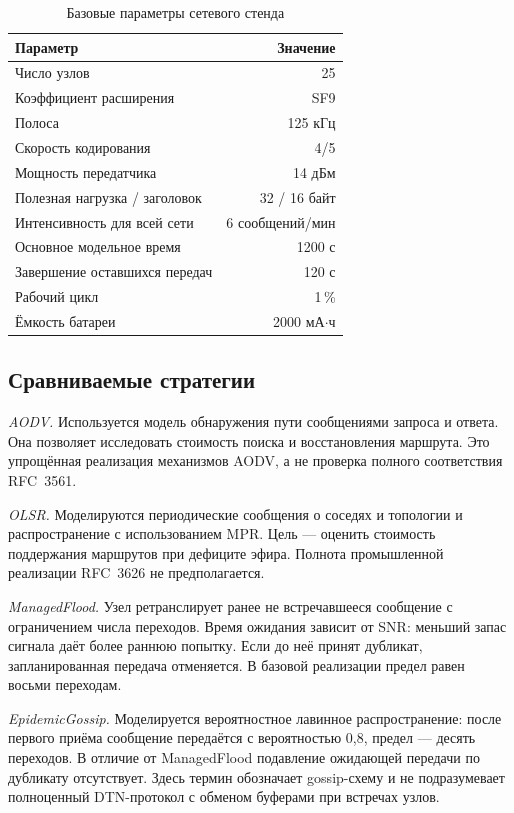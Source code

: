 \begin{table}[t]
\caption{Базовые параметры сетевого стенда}
\label{tab:params}
\centering
\small
\begin{tabular}{@{}p{}r@{}}
\toprule
Параметр & Значение \\
\midrule
Число узлов & 25 \\
Коэффициент расширения & SF9 \\
Полоса & 125 кГц \\
Скорость кодирования & 4/5 \\
Мощность передатчика & 14 дБм \\
Полезная нагрузка / заголовок & 32 / 16 байт \\
Интенсивность для всей сети & 6 сообщений/мин \\
Основное модельное время & 1200 с \\
Завершение оставшихся передач & 120 с \\
Рабочий цикл & 1\,\% \\
Ёмкость батареи & 2000 мА$\cdot$ч \\
\bottomrule
\end{tabular}
\end{table}

\subsection{Сравниваемые стратегии}

\textit{AODV.} Используется модель обнаружения пути сообщениями запроса и ответа. Она позволяет исследовать стоимость поиска и восстановления маршрута. Это упрощённая реализация механизмов AODV, а не проверка полного соответствия RFC~3561.

\textit{OLSR.} Моделируются периодические сообщения о соседях и топологии и распространение с использованием MPR. Цель --- оценить стоимость поддержания маршрутов при дефиците эфира. Полнота промышленной реализации RFC~3626 не предполагается.

\textit{ManagedFlood.} Узел ретранслирует ранее не встречавшееся сообщение с ограничением числа переходов. Время ожидания зависит от SNR: меньший запас сигнала даёт более раннюю попытку. Если до неё принят дубликат, запланированная передача отменяется. В базовой реализации предел равен восьми переходам.

\textit{EpidemicGossip.} Моделируется вероятностное лавинное распространение: после первого приёма сообщение передаётся с вероятностью 0,8, предел --- десять переходов. В отличие от ManagedFlood подавление ожидающей передачи по дубликату отсутствует. Здесь термин обозначает gossip-схему и не подразумевает полноценный DTN-протокол с обменом буферами при встречах узлов.

